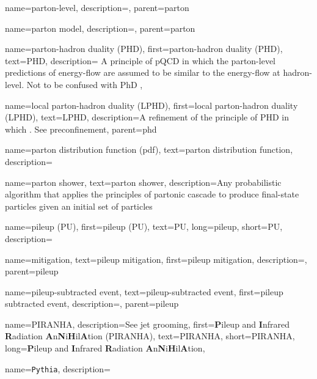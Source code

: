    {
      name=parton-level,
      description={},
      parent=parton
    }

    {
      name=parton model,
      description={},
      parent=parton
    }


{
  name=parton-hadron duality (PHD),
  first=parton-hadron duality (PHD),
  text=PHD,
  description={
      A principle of pQCD in which the parton-level predictions of energy-flow are assumed to be similar to the energy-flow at hadron-level.
      Not to be confused with PhD 
  },
}

    {
      name=local parton-hadron duality (LPHD),
      first=local parton-hadron duality (LPHD),
      text=LPHD,
      description={A refinement of the principle of PHD in which \sam{}.
      See preconfinement},
      parent=phd
    }




{
  name=parton distribution function (pdf),
  text=parton distribution function,
  description={}
}



{
  name=parton shower,
  text=parton shower,
  description={Any probabilistic algorithm that applies the principles of partonic cascade to produce final-state particles given an initial set of particles}
}


{
  name=pileup (PU),
  first=pileup (PU),
  text=PU,
  long=pileup,
  short=PU,
  description={}
}

    {
      name=mitigation,
      text=pileup mitigation,
      first=pileup mitigation,
      description={},
      parent=pileup
    }

    {
      name=pileup-subtracted event,
      text=pileup-subtracted event,
      first=pileup subtracted event,
      description={},
      parent=pileup
    }

{
    name=PIRANHA,
    description={See jet grooming},
    first={\textbf{P}ileup and \textbf{I}nfrared \textbf{R}adiation \textbf{A}n\textbf{N}i\textbf{H}il\textbf{A}tion (PIRANHA)},
    text={PIRANHA},
    short={PIRANHA},
    long={\textbf{P}ileup and \textbf{I}nfrared \textbf{R}adiation \textbf{A}n\textbf{N}i\textbf{H}il\textbf{A}tion},
}


{
  name=\texttt{Pythia},
  description={}
}

